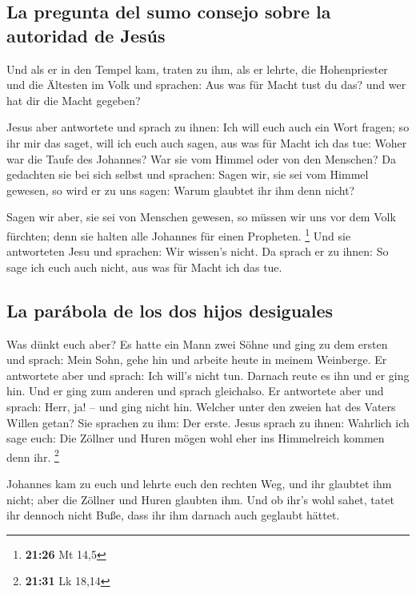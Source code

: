 \hypertarget{la-pregunta-del-sumo-consejo-sobre-la-autoridad-de-jesuxfas}{%
\subsection{La pregunta del sumo consejo sobre la autoridad de
Jesús}\label{la-pregunta-del-sumo-consejo-sobre-la-autoridad-de-jesuxfas}}

 Und als er in den Tempel kam, traten zu ihm, als er
lehrte, die Hohenpriester und die Ältesten im Volk und sprachen: Aus was
für Macht tust du das? und wer hat dir die Macht gegeben?

 Jesus aber antwortete und sprach zu ihnen: Ich will euch
auch ein Wort fragen; so ihr mir das saget, will ich euch auch sagen,
aus was für Macht ich das tue:  Woher war die Taufe des
Johannes? War sie vom Himmel oder von den Menschen? Da gedachten sie bei
sich selbst und sprachen: Sagen wir, sie sei vom Himmel gewesen, so wird
er zu uns sagen: Warum glaubtet ihr ihm denn nicht?

 Sagen wir aber, sie sei von Menschen gewesen, so müssen
wir uns vor dem Volk fürchten; denn sie halten alle Johannes für einen
Propheten. \footnote{\textbf{21:26} Mt 14,5}  Und sie
antworteten Jesu und sprachen: Wir wissen's nicht. Da sprach er zu
ihnen: So sage ich euch auch nicht, aus was für Macht ich das tue.

\hypertarget{la-paruxe1bola-de-los-dos-hijos-desiguales}{%
\subsection{La parábola de los dos hijos
desiguales}\label{la-paruxe1bola-de-los-dos-hijos-desiguales}}

 Was dünkt euch aber? Es hatte ein Mann zwei Söhne und
ging zu dem ersten und sprach: Mein Sohn, gehe hin und arbeite heute in
meinem Weinberge.  Er antwortete aber und sprach: Ich
will's nicht tun. Darnach reute es ihn und er ging hin. 
Und er ging zum anderen und sprach gleichalso. Er antwortete aber und
sprach: Herr, ja! -- und ging nicht hin.  Welcher unter
den zweien hat des Vaters Willen getan? Sie sprachen zu ihm: Der erste.
Jesus sprach zu ihnen: Wahrlich ich sage euch: Die Zöllner und Huren
mögen wohl eher ins Himmelreich kommen denn ihr. \footnote{\textbf{21:31}
  Lk 18,14}

 Johannes kam zu euch und lehrte euch den rechten Weg,
und ihr glaubtet ihm nicht; aber die Zöllner und Huren glaubten ihm. Und
ob ihr's wohl sahet, tatet ihr dennoch nicht Buße, dass ihr ihm darnach
auch geglaubt hättet.

